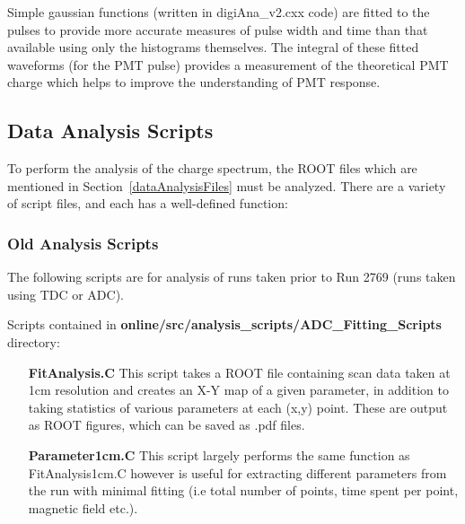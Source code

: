 \documentclass[twoside,letterpaper]{refart}
\begin{document}
\FloatBarrier

Simple gaussian functions (written in digiAna\_v2.cxx code) are fitted to the pulses to provide more accurate measures of pulse width and time than that available using only the histograms themselves. The integral of these fitted waveforms (for the PMT pulse) provides a measurement of the theoretical PMT charge which helps to improve the understanding of PMT response.

\subsection{Data Analysis Scripts}

To perform the analysis of the charge spectrum, the ROOT files which are mentioned in Section~\ref{dataAnalysisFiles} must be analyzed. There are a variety of script files, and each has a well-defined function:

\subsubsection{Old Analysis Scripts}

The following scripts are for analysis of runs taken prior to Run 2769 (runs taken using TDC or ADC).

Scripts contained in \textbf{online/src/analysis\_scripts/ADC\_Fitting\_Scripts} directory:

\begin{enumerate}
	
	\item[\textbf{FitAnalysis.C}] This script takes a ROOT file containing scan data taken at 1cm resolution and creates an X-Y map of a given parameter, in addition to taking statistics of various parameters at each (x,y) point. These are output as ROOT figures, which can be saved as .pdf files.
	\item[\textbf{Parameter1cm.C}] This script largely performs the same function as FitAnalysis1cm.C however is useful for extracting different parameters from the run with minimal fitting (i.e total number of points, time spent per point, magnetic field etc.).
	
\end{enumerate}



\end{document}

